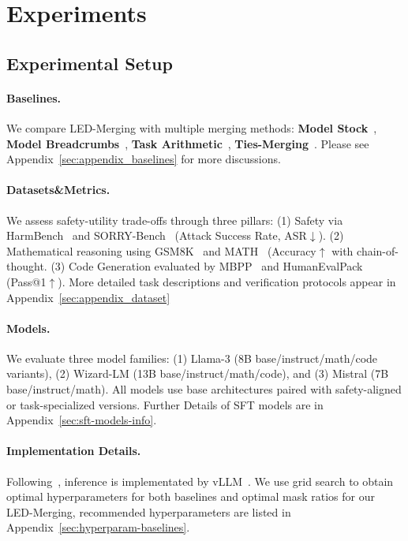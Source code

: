 
\section{Experiments}


\subsection{Experimental Setup}
\label{sec:exp_setup}
\paragraph{Baselines.} We compare LED-Merging with multiple merging methods: \textbf{Model Stock}~\cite{modelstock}, \textbf{Model Breadcrumbs}~\cite{breadcrumbs}, \textbf{Task Arithmetic}~\cite{ilharco2023editing}, \textbf{Ties-Merging}~\cite{tiesmerging}. Please see Appendix~\ref{sec:appendix_baselines} for more discussions.

\paragraph{Datasets\&Metrics.}
We assess safety-utility trade-offs through three pillars: (1) Safety via HarmBench~\cite{harmbench} and SORRY-Bench~\cite{xie2024sorrybench} (Attack Success Rate, ASR$\downarrow$). (2) Mathematical reasoning using GSM8K~\cite{gsm8k} and MATH~\cite{hendrycksmath2021} (Accuracy$\uparrow$ with chain-of-thought. (3) Code Generation evaluated by MBPP~\cite{mbpp} and HumanEvalPack~\cite{humanevalpack} (Pass@1$\uparrow$). More detailed task descriptions and verification protocols appear in Appendix~\ref{sec:appendix_dataset}

\paragraph{Models.} 
We evaluate three model families: (1) Llama-3 (8B base/instruct/math/code variants), (2) Wizard-LM (13B base/instruct/math/code), and (3) Mistral (7B base/instruct/math). All models use base architectures paired with safety-aligned or task-specialized versions. Further Details of SFT models are in Appendix~\ref{sec:sft-models-info}.

\paragraph{Implementation Details.} Following~\cite{dare,xu2024wizardlm,hendrycksmath2021}, inference is implementated by vLLM~\cite{kwon2023efficient}. We use grid search to obtain optimal hyperparameters for both baselines and optimal mask ratios for our LED-Merging, recommended hyperparameters are listed in Appendix~\ref{sec:hyperparam-baselines}. 


